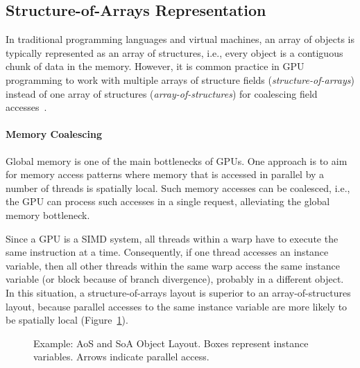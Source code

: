 \documentclass[preprint]{sigplanconf}
\begin{document}
\subsection{Structure-of-Arrays Representation}
In traditional programming languages and virtual machines, an array of objects is typically represented as an array of structures, i.e., every object is a contiguous chunk of data in the memory. However, it is common practice in GPU programming to work with multiple arrays of structure fields (\emph{structure-of-arrays}) instead of one array of structures (\emph{array-of-structures}) for coalescing field accesses~\cite{Mei2016, Abel:1999:ATS}.

\paragraph{Memory Coalescing}
Global memory is one of the main bottlenecks of GPUs. One approach is to aim for memory access patterns where memory that is accessed in parallel by a number of threads is spatially local. Such memory accesses can be coalesced, i.e., the GPU can process such accesses in a single request, alleviating the global memory bottleneck.

Since a GPU is a SIMD system, all threads within a warp have to execute the same instruction at a time. Consequently, if one thread accesses an instance variable, then all other threads within the same warp access the same instance variable (or block because of branch divergence), probably in a different object. In this situation, a structure-of-arrays layout is superior to an array-of-structures layout, because parallel accesses to the same instance variable are more likely to be spatially local (Figure~\ref{fig:ex_obj_layout}).

\begin{figure}[!htp]
    \centering
    
    \caption{Example: AoS and SoA Object Layout. Boxes represent instance variables. Arrows indicate parallel access.}
    \label{fig:ex_obj_layout}%
\end{figure}
\end{document}
